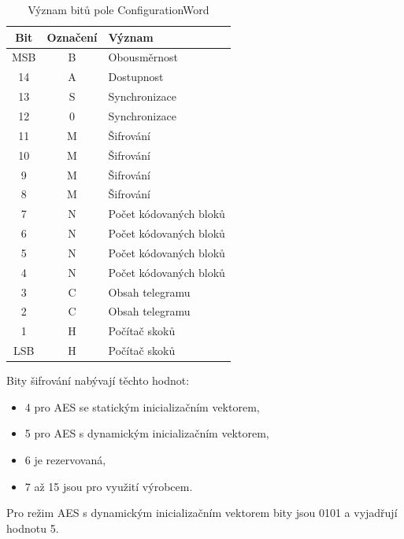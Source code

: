 \begin{table}[!ht]
\centering
\caption{Význam bitů pole ConfigurationWord}
\label{TableConfigurationWord}
\begin{tabular}{|c|c|l|}
\hline
\textbf{Bit} & \textbf{Označení} & \textbf{Význam}        \\ \hline \hline
MSB          & B                 & Obousměrnost           \\ \hline
14           & A                 & Dostupnost             \\ \hline
13           & S                 & Synchronizace          \\ \hline
12           & 0                 & Synchronizace          \\ \hline
11           & M                 & Šifrování              \\ \hline
10           & M                 & Šifrování              \\ \hline
9            & M                 & Šifrování              \\ \hline
8            & M                 & Šifrování              \\ \hline
7            & N                 & Počet kódovaných bloků \\ \hline
6            & N                 & Počet kódovaných bloků \\ \hline
5            & N                 & Počet kódovaných bloků \\ \hline
4            & N                 & Počet kódovaných bloků \\ \hline
3            & C                 & Obsah telegramu        \\ \hline
2            & C                 & Obsah telegramu        \\ \hline
1            & H                 & Počítač skoků          \\ \hline
LSB          & H                 & Počítač skoků          \\  \hline  \hline
\end{tabular}
\end{table}

Bity šifrování nabývají těchto hodnot:
\begin{itemize}
	\item 4 pro AES se statickým inicializačním vektorem,
	\item 5 pro AES s dynamickým inicializačním vektorem,
	\item 6 je rezervovaná,
	\item 7 až 15 jsou pro využití výrobcem.
\end{itemize}
Pro režim AES s dynamickým inicializačním vektorem bity jsou 0101 a vyjadřují hodnotu 5.

